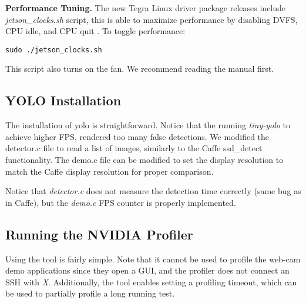 \textbf{Performance Tuning.}
The new Tegra Linux driver package releases include \textit{jetson\_clocks.sh} script, this is able to maximize performance by disabling DVFS, CPU idle, and CPU quit \cite{tegradriverpack242}. To toggle performance:
\begin{lstlisting} 
sudo ./jetson_clocks.sh
\end{lstlisting}
This script also turns on the fan. We recommend reading the manual first.

\subsection{YOLO Installation}
The installation of yolo is straightforward. Notice that the running \textit{tiny-yolo} to achieve higher FPS, rendered too many false detections.
We modified the detector.c file to read a list of images, similarly to the Caffe ssd\_detect functionality. The demo.c file can be modified to set the display resolution to match the Caffe display resolution for proper comparison.

Notice that \textit{detector.c} does not measure the detection time correctly (same bug as in Caffe), but the \textit{demo.c} FPS counter is properly implemented.

\subsection{Running the NVIDIA Profiler}
Using the tool is fairly simple. Note that it cannot be used to profile the web-cam demo applications since they open a GUI, and the profiler does not connect an SSH with \textit{X}. Additionally, the tool enables setting a profiling timeout, which can be used to partially profile a long running test. 
